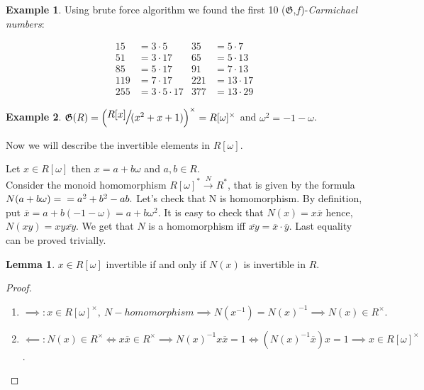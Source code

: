 \documentclass{article}
\theoremstyle{definition}
\newtheorem{example}{Example}
\theoremstyle{definition}
\newtheorem{lemma}{Lemma}
\begin{document}
\begin{example}
Using brute force algorithm we found the first 10 ($\mathfrak{G}$,$f$)-\textit{Carmichael numbers}:

$$\begin{aligned}
    15 &= 3 \cdot 5  \quad &35 &= 5 \cdot 7\\
    51 &= 3 \cdot 17 \quad &65 &= 5 \cdot 13\\
    85 &= 5 \cdot 17 \quad &91 &= 7 \cdot 13\\
    119 &= 7 \cdot 17 \quad &221 &= 13 \cdot 17\\
    255 &= 3 \cdot 5 \cdot 17 &377 &= 13 \cdot 29
    \end{aligned}$$

\end{example}

\begin{example}
    $\mathfrak{G}(R) = \Large{\left( \sfrac{R[x]}{ (x^2+x+1)}\right)^{\times}} = 
    R[\omega]^{\times}$ and $\omega^2 = -1 - \omega$.

Now we will describe the invertible elements in $R[\omega].$

    Let $x \in R[\omega]$ then $x = a + b\omega$ and $a, b \in R$.\\
    Consider the monoid homomorphism $R[\omega]^*  \xrightarrow{\ N\ } R^*$, that is given by the formula $N(a+b\omega) = 
    \\ = a^2 + b^2 - ab.$
    Let's check that N is homomorphism.
    By definition, put $\overline{x} =  a + b(-1 - \omega) = a + b\omega^2 $. It is easy to check that $N(x) = 
    x\overline{x}$ hence, $N(xy) = 
    xy\overline{xy}$.
    We get that $N$ is a homomorphism iff $\overline{xy} = \overline{x}\cdot\overline{y}.$
    Last equality can be proved trivially.

    \begin{lemma}
        $x \in R[\omega]$ invertible if and only if $N(x)$ is invertible in $R$.
    \end{lemma}

    
    \begin{proof}
    \hspace*{5cm}
    \begin{enumerate}
        \item $\implies: x \in R[\omega]^{\times},\ N - homomorphism \implies N(x^{-1}) = N(x)^{-1} \implies N(x)  
        \in R^{\times}.$
        \item $\impliedby:N(x) \in R^{\times} \iff x\overline{x} \in R^{\times} \implies N(x)^{-1}x\overline{x} = 1 
        \iff (N(x)^{-1}\overline{x})x = 1 \implies x \in R[\omega]^{\times}$.
    \end{enumerate}
    \end{proof}


\end{example}
\end{document}
